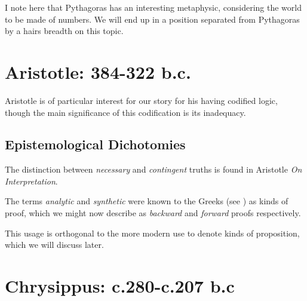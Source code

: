 
I note here that Pythagoras has an interesting metaphysic, considering the world to be made of numbers.
We will end up in a position separated from Pythagoras by a hairs breadth on this topic.










\section{Aristotle: 384-322 b.c.}

Aristotle is of particular interest for our story for his having codified logic, though the main significance of this codification is its inadequacy.

\subsection{Epistemological Dichotomies}

The distinction between {\it necessary} and {\it contingent} truths is found in Aristotle {\it On Interpretation}.

The terms {\it analytic} and {\it synthetic} were known to the Greeks (see \cite{euclidEL1}) as kinds of proof, which we might now describe as {\it backward} and {\it forward} proofs respectively.

This usage is orthogonal to the more modern use to denote kinds of proposition, which we will discuss later.


\section{Chrysippus: c.280-c.207 b.c}

